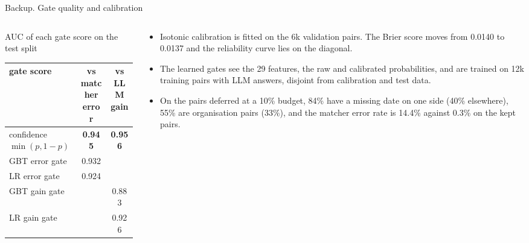 \documentclass[aspectratio=169,10pt]{beamer}
\begin{document}
\appendix
\begin{frame}{Backup. Gate quality and calibration}
\begin{columns}[T]
\begin{column}{0.5\textwidth}
\footnotesize AUC of each gate score on the test split\\[1mm]
{\scriptsize\begin{tabular}{@{}lcc@{}}
\toprule
gate score & vs matcher error & vs LLM gain\\
\midrule
confidence $\min(p,1-p)$ & \textbf{0.945} & \textbf{0.956}\\
GBT error gate & 0.932 & \\
LR error gate & 0.924 & \\
GBT gain gate & & 0.883\\
LR gain gate & & 0.926\\
\bottomrule
\end{tabular}}
\end{column}
\begin{column}{0.48\textwidth}
\small
\begin{itemize}
\item Isotonic calibration is fitted on the 6k validation pairs. The Brier score moves from 0.0140 to 0.0137 and the reliability curve lies on the diagonal.
\item The learned gates see the 29 features, the raw and calibrated probabilities, and are trained on 12k training pairs with LLM answers, disjoint from calibration and test data.
\item On the pairs deferred at a 10\% budget, 84\% have a missing date on one side (40\% elsewhere), 55\% are organisation pairs (33\%), and the matcher error rate is 14.4\% against 0.3\% on the kept pairs.
\end{itemize}
\end{column}
\end{columns}
\end{frame}
\end{document}
